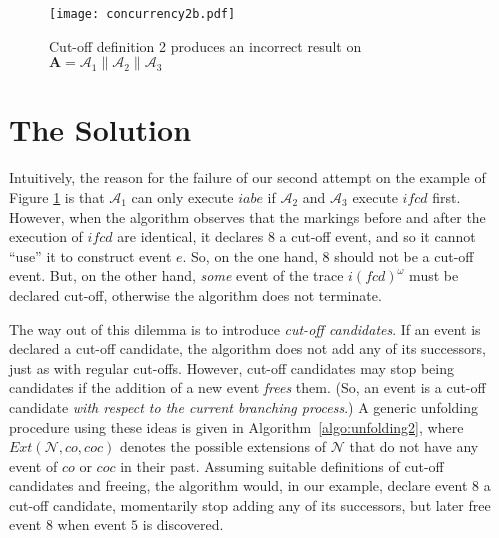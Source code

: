 \documentclass{llncs}
\def\A{\mathcal{A}}
\def\prod{\mathbf{A}}
\def\N{\mathcal{N}}
\def\co{co}
\def\tco{coc}
\begin{document}
\begin{figure}[htbp]
\centering
\texttt{[image: concurrency2b.pdf]}
\caption{Cut-off definition 2 produces an incorrect result on $\prod=\A_1 \parallel \A_2 \parallel \A_3$}\label{fig:needconc}
\label{fig:concneeded}
\end{figure}


\section{The Solution}

Intuitively, the reason for the failure of our second attempt
on the example of Figure \ref{fig:concneeded} is that $\A_1$ can only execute $iabe$ if $\A_2$ and $\A_3$ 
execute $\mathit{ifcd}$ first. However, when the algorithm observes that the markings before and after 
the execution of $\mathit{ifcd}$ are identical, it declares $8$ a cut-off event, and so it cannot ``use'' it to construct event $e$.
So, on the one hand, $8$ should not be a cut-off event. But, on the other hand, {\em some} event of the trace 
$\mathit{i}(\mathit{fcd})^\omega$ must be declared cut-off, otherwise the algorithm does not terminate. 

The way out of this dilemma is to introduce {\em cut-off candidates}.
If an event is declared a cut-off candidate, the algorithm does not add any of its 
successors, just as with regular cut-offs. However, cut-off candidates may stop being candidates if the addition of a new event {\em frees} them. 
(So, an event is a cut-off candidate {\em with respect to the current branching process}.) A generic unfolding procedure using these ideas is given in Algorithm~\ref{algo:unfolding2}, where 
$Ext(\N,\co,\tco)$ denotes the possible extensions of $\N$ that do not have any 
event of $\co$ or $\tco$ in their past.
Assuming suitable definitions of cut-off candidates and freeing, the algorithm
would, in our example, declare event $8$ a cut-off candidate, momentarily stop adding any of its successors, but later free event $8$ when event $5$ is discovered.
\end{document}
